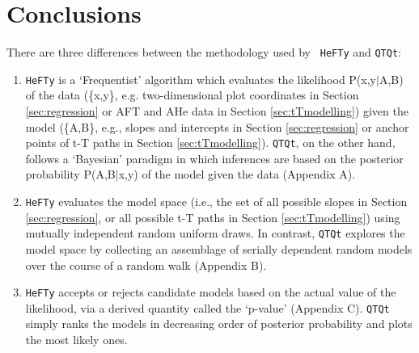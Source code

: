 \documentclass{article}
\begin{document}
\section{Conclusions}

There are three differences between the methodology used by {\tt
  HeFTy} and {\tt QTQt}:

\begin{enumerate} 
\item {\tt HeFTy} is a `Frequentist' algorithm which evaluates the
  likelihood P(x,y$|$A,B) of the data (\{x,y\}, e.g. two-dimensional
  plot coordinates in Section \ref{sec:regression} or AFT and AHe data
  in Section \ref{sec:tTmodelling}) given the model (\{A,B\}, e.g.,
  slopes and intercepts in Section \ref{sec:regression} or anchor
  points of t-T paths in Section \ref{sec:tTmodelling}).  {\tt QTQt},
  on the other hand, follows a `Bayesian' paradigm in which inferences
  are based on the posterior probability P(A,B$|$x,y) of the model
  given the data (Appendix A).
\item {\tt HeFTy} evaluates the model space (i.e., the set of all
  possible slopes in Section \ref{sec:regression}, or all possible t-T
  paths in Section \ref{sec:tTmodelling}) using mutually independent
  random uniform draws. In contrast, {\tt QTQt} explores the model
  space by collecting an assemblage of serially dependent random
  models over the course of a random walk (Appendix B).
\item {\tt HeFTy} accepts or rejects candidate models based on the
  actual value of the likelihood, via a derived quantity called the
  `p-value' (Appendix C). {\tt QTQt} simply ranks the models in
  decreasing order of posterior probability and plots the most likely
  ones.
\end{enumerate}
\end{document}
